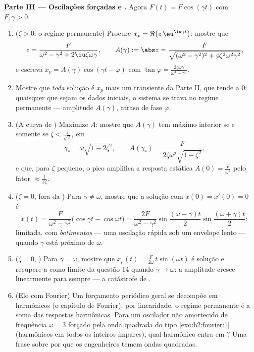 \begin{problem}
\medskip
\noindent\textbf{Parte III --- Oscilações forçadas e
.} Agora $F(t) = F\cos(\gamma t)$ com $F, \gamma > 0$.
\begin{enumerate}[resume]
  \item ($\zeta > 0$: o regime permanente) Procure $x_p =
        \Re\bigl(z\,\eu^{\iu\gamma t}\bigr)$: mostre que
        \[
        z = \frac{F}{\omega^2 - \gamma^2 +
        2\iu\zeta\omega\gamma},
        \qquad
        A(\gamma) := \abs z = \frac{F}{\sqrt{(\omega^2 -
        \gamma^2)^2 + 4\zeta^2\omega^2\gamma^2}} ,
        \]
        e escreva $x_p = A(\gamma)\cos(\gamma t - \varphi)$
        com $\tan\varphi =
        \frac{2\zeta\omega\gamma}{\omega^2-\gamma^2}$.
  \item Mostre que \emph{toda} solução é $x_p$ mais um
        transiente da Parte II, que tende a $0$: quaisquer que
        sejam os dados iniciais, o sistema se trava no regime
        permanente --- amplitude $A(\gamma)$, atraso de fase
        $\varphi$.
  \item (A curva de ) Maximize $A$: mostre que
        $A(\gamma)$ tem máximo interior se e somente se $\zeta <
        \frac{1}{\sqrt2}$, em
        \[
        \gamma_* = \omega\sqrt{1 - 2\zeta^2},
        \qquad
        A(\gamma_*) =
        \frac{F}{2\zeta\omega^2\sqrt{1-\zeta^2}} ,
        \]
        e que, para $\zeta$ pequeno, o pico amplifica a
        resposta estática $A(0) = \frac F{\omega^2}$ pelo
        fator $\approx \frac{1}{2\zeta}$.
  \item ($\zeta = 0$, fora da ) Para $\gamma \neq \omega$,
        mostre que a solução com $x(0) = x'(0) = 0$ é
        \[
        x(t) = \frac{F}{\omega^2 -
        \gamma^2}\bigl(\cos\gamma t - \cos\omega t\bigr)
        = \frac{2F}{\omega^2-\gamma^2}
        \sin\frac{(\omega-\gamma)t}{2}
        \sin\frac{(\omega+\gamma)t}{2} :
        \]
        limitada, com \emph{batimentos} --- uma oscilação rápida
        sob um envelope lento --- quando $\gamma$ está próximo de
        $\omega$.
  \item ($\zeta = 0$, ) Para $\gamma = \omega$, mostre
        que $x_p(t) = \frac{F}{2\omega}\,t\sin(\omega t)$ é
        solução e recupere-a como limite da questão
        14 quando $\gamma \to \omega$: a amplitude cresce
        linearmente para sempre --- a catástrofe de .
  \item (Elo com Fourier) Um forçamento periódico geral se decompõe
        em harmônicos (o capítulo de Fourier); por linearidade, o
        regime permanente é a soma das respostas harmônicas. Para
        um oscilador não amortecido de frequência $\omega = 3$
        forçado pela onda quadrada do tipo
        \cref{exo:b2:fourier:1} (harmônicos em todos os
        inteiros ímpares), qual harmônico entra em ? Uma frase sobre
        por que os engenheiros temem ondas quadradas.
\end{enumerate}


\end{problem}
